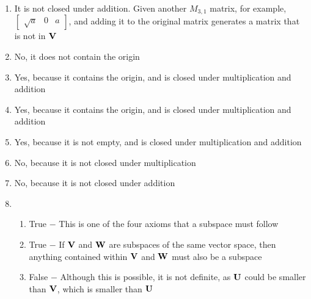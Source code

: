 \documentclass[12pt]{article}
\begin{document}
\begin{enumerate}
  \item It is not closed under addition. Given another $M_{3,1}$ matrix, for example, $\begin{bmatrix} \sqrt{a} & 0 & a \end{bmatrix}$, and adding it to the original matrix generates a matrix that is not in $\bold{V}$

    \setcounter{enumi}{20}

  \item No, it does not contain the origin

    \setcounter{enumi}{22}

  \item Yes, because it contains the origin, and is closed under multiplication and addition

    \setcounter{enumi}{26}

  \item  Yes, because it contains the origin, and is closed under multiplication and addition

    \setcounter{enumi}{29}

  \item Yes, because it is not empty, and is closed under multiplication and addition

  \item No, because it is not closed under multiplication

    \setcounter{enumi}{32}

  \item No, because it is not closed under addition

    \setcounter{enumi}{42}

  \item

    \begin{enumerate}

      \item True $-$ This is one of the four axioms that a subspace must follow

      \item True $-$ If $\bold{V}$ and $\bold{W}$ are subspaces of the same vector space, then anything contained within $\bold{V}$ and $\bold{W}$ must also be a subspace

      \item False $-$ Although this is possible, it is not definite, as $\bold{U}$ could be smaller than $\bold{V}$, which is smaller than $\bold{U}$

    \end{enumerate}


\end{enumerate}
\end{document}
